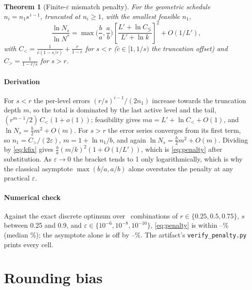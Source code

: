 \documentclass[preprint,12pt]{elsarticle}
\newtheorem{theorem}{Theorem}
\newcommand{\eps}{\varepsilon}
\begin{document}
\begin{theorem}[Finite-$\eps$ mismatch penalty]\label{thm:penalty}
For the geometric schedule $n_i=n_1s^{\,i-1}$, truncated at $n_i\ge1$, with the
smallest feasible $n_1$,
\begin{equation}\label{eq:penalty}
\frac{\ln N_s}{\ln N^\ast}=\max\!\Big(\frac{b}{a},\frac{a}{b}\Big)
\left[\frac{L'+\ln C_{\lessgtr}}{L'+\ln k}\right]^{2}+O(1/L'),
\end{equation}
with $C_<=\frac{1}{\bar c(1-s/r)}+\frac{r}{1-r}$ for $s<r$ ($\bar c\in[1,1/s)$
the truncation offset) and $C_>=\frac{1}{1-r/s}$ for $s>r$.
\end{theorem}

\paragraph{Derivation} For $s<r$ the per-level errors $(r/s)^{i-1}/(2n_1)$
increase towards the truncation depth $m$, so the total is dominated by the last
active level and the tail, $(r^{m-1}/2)\,C_<(1+o(1))$; feasibility gives
$ma=L'+\ln C_<+O(1)$, and $\ln N_s=\tfrac{b}{2}m^2+O(m)$. For $s>r$ the error
series converges from its first term, so $n_1=C_>/(2\eps)$, $m=1+\ln n_1/b$, and
again $\ln N_s=\tfrac{b}{2}m^2+O(m)$. Dividing by \eqref{eq:kfix} gives
$\frac{b}{a}(m/k)^2(1+O(1/L'))$, which is \eqref{eq:penalty} after substitution.
As $\eps\to0$ the bracket tends to 1 only logarithmically, which is why the
classical asymptote $\max(b/a,a/b)$ alone overstates the penalty at any practical
$\eps$.

\paragraph{Numerical check} Against the exact discrete optimum over \hPenCells\
combinations of $r\in\{0.25,0.5,0.75\}$, $s$ between 0.25 and 0.9, and
$\eps\in\{10^{-6},10^{-8},10^{-10}\}$, \eqref{eq:penalty} is within
\hPenLo--\hPenHi\% (median \hPenMed\%); the asymptote alone is off by
\hAsyLo--\hAsyHi\%. The artifact's \texttt{verify\_penalty.py} prints every cell.

\section{Rounding bias}\label{app:bias}
\end{document}
